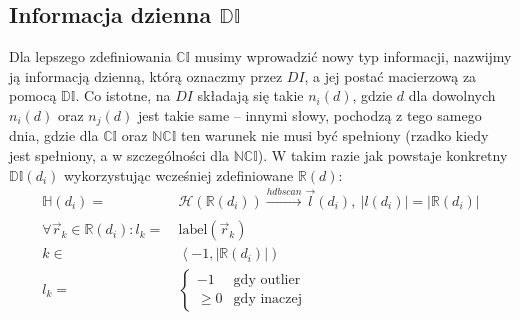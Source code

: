 \subsection{Informacja dzienna $\mathbb{DI}$}

Dla lepszego zdefiniowania $\mathbb{CI}$ musimy wprowadzić nowy typ informacji, nazwijmy ją informacją dzienną, 
którą oznaczmy przez $DI$, a jej postać macierzową za pomocą $\mathbb{DI}$. Co istotne, na $DI$ składają się takie 
$ n_{i}(d)$, gdzie $d$ dla dowolnych $n_{i}(d)$ oraz $n_{j}(d)$ jest takie same -- innymi słowy, pochodzą 
z tego samego dnia, gdzie dla $\mathbb{CI}$ oraz $\mathbb{NCI}$ ten warunek nie musi być spełniony 
(rzadko kiedy jest spełniony, a w szczególności dla $\mathbb{NCI}$). W takim razie jak powstaje konkretny 
$\mathbb{DI}(d_{i})$ wykorzystując wcześniej zdefiniowane $\mathbb{R}(d)$:
\begin{equation} \label{eq:hdbscan_def}
    \begin{aligned}
        \mathbb{H}(d_{i}) = \: &
            \mathcal{H}(\mathbb{R}(d_{i})) 
                \xrightarrow[]{hdbscan} 
            \vec{l}(d_{i}), \: |l(d_{i})| = |\mathbb{R}(d_{i})| 
            \\
        \forall \vec{r}_{k} 
            \in 
                \mathbb{R}(d_{i}): l_{k} = \: & \textrm{label}(\vec{r}_{k}) 
        \\
        k \in \: & \left< -1, |\mathbb{R}(d_{i})| \right) \\
        l_{k} = \: &
        \begin{cases}
            -1 &\text{gdy outlier} \\
            \geq 0 &\text{gdy inaczej}
        \end{cases}
    \end{aligned}
\end{equation}


